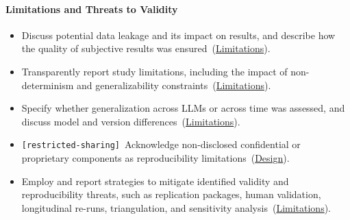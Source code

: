 \documentclass[smallextended]{svjour3}
\makeatletter
\newcommand{\must}{\textbf{must}\xspace}
\newcommand{\should}{\textbf{should}\xspace}
\newcommand{\iconM}{\usebox{\iconMbox}\xspace}
\newcommand{\iconS}{\usebox{\iconSbox}\xspace}
\newcommand{\iconM}{●\xspace}
\newcommand{\iconS}{○\xspace}
\newcommand{\condition}[1]{\texttt{\small[#1]}\,}
\newcommand{\condition}[1]{@@cond:#1@@}
\newcommand{\refdesign}{\hyperref[sec:report-system-and-prompt-design]{Design}}
\newcommand{\reflimitations}{\hyperref[sec:report-limitations-and-mitigations]{Limitations}}
\newcommand{\refdesign}{\href{/guidelines/design/}{Design}}
\newcommand{\reflimitations}{\href{/guidelines/limitations/}{Limitations}}
\makeatother
\begin{document}
\begin{appendices}
\paragraph{\textbf{Limitations and Threats to Validity}}
\begin{itemize}[label={},leftmargin=*]
    \item \iconM Discuss potential data leakage and its impact on results, and describe how the quality of subjective results was ensured~(\reflimitations).
    \item \iconM Transparently report study limitations, including the impact of non-determinism and generalizability constraints~(\reflimitations).
    \item \iconM Specify whether generalization across LLMs or across time was assessed, and discuss model and version differences~(\reflimitations).
    \item \iconM \condition{restricted-sharing} Acknowledge non-disclosed confidential or proprietary components as reproducibility limitations~(\refdesign).
    \item \iconS Employ and report strategies to mitigate identified validity and reproducibility threats, such as replication packages, human validation, longitudinal re-runs, triangulation, and sensitivity analysis~(\reflimitations).
\end{itemize}
\space%

\end{appendices}
\space%
\end{document}
